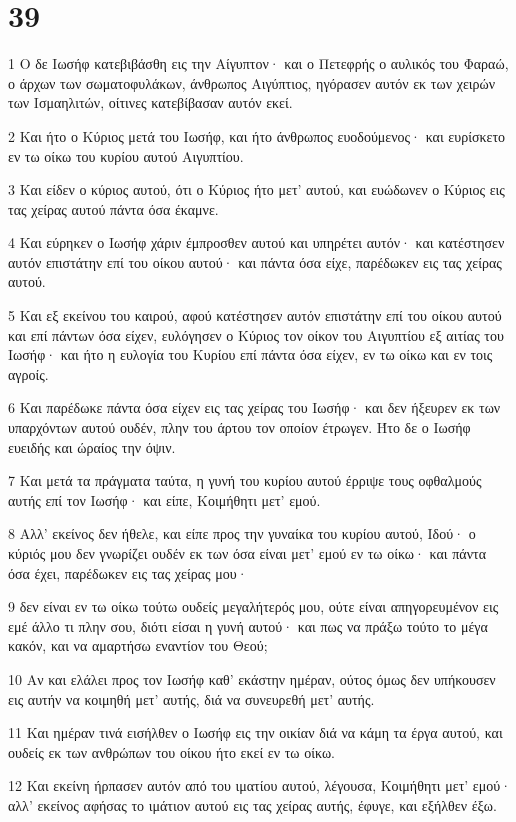 \chapter{39}

\par 1 Ο δε Ιωσήφ κατεβιβάσθη εις την Αίγυπτον· και ο Πετεφρής ο αυλικός του Φαραώ, ο άρχων των σωματοφυλάκων, άνθρωπος Αιγύπτιος, ηγόρασεν αυτόν εκ των χειρών των Ισμαηλιτών, οίτινες κατεβίβασαν αυτόν εκεί.
\par 2 Και ήτο ο Κύριος μετά του Ιωσήφ, και ήτο άνθρωπος ευοδούμενος· και ευρίσκετο εν τω οίκω του κυρίου αυτού Αιγυπτίου.
\par 3 Και είδεν ο κύριος αυτού, ότι ο Κύριος ήτο μετ' αυτού, και ευώδωνεν ο Κύριος εις τας χείρας αυτού πάντα όσα έκαμνε.
\par 4 Και εύρηκεν ο Ιωσήφ χάριν έμπροσθεν αυτού και υπηρέτει αυτόν· και κατέστησεν αυτόν επιστάτην επί του οίκου αυτού· και πάντα όσα είχε, παρέδωκεν εις τας χείρας αυτού.
\par 5 Και εξ εκείνου του καιρού, αφού κατέστησεν αυτόν επιστάτην επί του οίκου αυτού και επί πάντων όσα είχεν, ευλόγησεν ο Κύριος τον οίκον του Αιγυπτίου εξ αιτίας του Ιωσήφ· και ήτο η ευλογία του Κυρίου επί πάντα όσα είχεν, εν τω οίκω και εν τοις αγροίς.
\par 6 Και παρέδωκε πάντα όσα είχεν εις τας χείρας του Ιωσήφ· και δεν ήξευρεν εκ των υπαρχόντων αυτού ουδέν, πλην του άρτου τον οποίον έτρωγεν. Ήτο δε ο Ιωσήφ ευειδής και ώραίος την όψιν.
\par 7 Και μετά τα πράγματα ταύτα, η γυνή του κυρίου αυτού έρριψε τους οφθαλμούς αυτής επί τον Ιωσήφ· και είπε, Κοιμήθητι μετ' εμού.
\par 8 Αλλ' εκείνος δεν ήθελε, και είπε προς την γυναίκα του κυρίου αυτού, Ιδού· ο κύριός μου δεν γνωρίζει ουδέν εκ των όσα είναι μετ' εμού εν τω οίκω· και πάντα όσα έχει, παρέδωκεν εις τας χείρας μου·
\par 9 δεν είναι εν τω οίκω τούτω ουδείς μεγαλήτερός μου, ούτε είναι απηγορευμένον εις εμέ άλλο τι πλην σου, διότι είσαι η γυνή αυτού· και πως να πράξω τούτο το μέγα κακόν, και να αμαρτήσω εναντίον του Θεού;
\par 10 Αν και ελάλει προς τον Ιωσήφ καθ' εκάστην ημέραν, ούτος όμως δεν υπήκουσεν εις αυτήν να κοιμηθή μετ' αυτής, διά να συνευρεθή μετ' αυτής.
\par 11 Και ημέραν τινά εισήλθεν ο Ιωσήφ εις την οικίαν διά να κάμη τα έργα αυτού, και ουδείς εκ των ανθρώπων του οίκου ήτο εκεί εν τω οίκω.
\par 12 Και εκείνη ήρπασεν αυτόν από του ιματίου αυτού, λέγουσα, Κοιμήθητι μετ' εμού· αλλ' εκείνος αφήσας το ιμάτιον αυτού εις τας χείρας αυτής, έφυγε, και εξήλθεν έξω.
